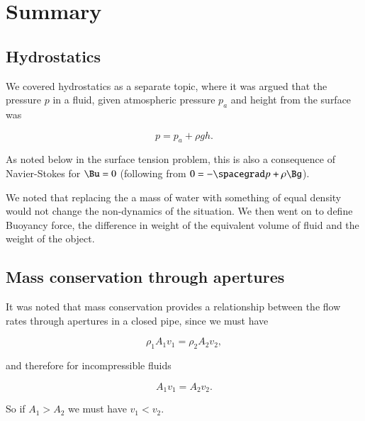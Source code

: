 \section{Summary}
\subsection{Hydrostatics}

We covered hydrostatics as a separate topic, where it was argued that the pressure $p$ in a fluid, given atmospheric pressure $p_a$ and height from the surface was

\begin{equation}\label{eqn:continuumFluidsReview:1850}
p = p_a + \rho g h.
\end{equation}

As noted below in the surface tension problem, this is also a consequence of Navier-Stokes for $\Bu = 0$ (following from $0 = -\spacegrad p + \rho \Bg$).

We noted that replacing the a mass of water with something of equal density would not change the non-dynamics of the situation.  We then went on to define Buoyancy force, the difference in weight of the equivalent volume of fluid and the weight of the object.

\subsection{Mass conservation through apertures}

It was noted that mass conservation provides a relationship between the flow rates through apertures in a closed pipe, since we must have

\begin{equation}\label{eqn:continuumFluidsReview:1870}
\rho_1 A_1 v_1 = \rho_2 A_2 v_2,
\end{equation}

and therefore for incompressible fluids

\begin{equation}\label{eqn:continuumFluidsReview:1890}
A_1 v_1 = A_2 v_2.
\end{equation}

So if $A_1 > A_2$ we must have $v_1 < v_2$.
